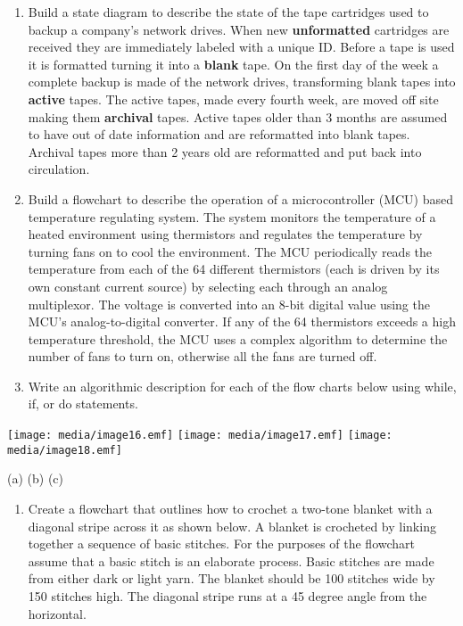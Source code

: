 \begin{itemize}
  \begin{enumerate}
  \def\labelenumi{\arabic{enumi}.}
  \item
    Build a state diagram to describe the state of the tape cartridges
    used to backup a company's network drives. When new
    \textbf{unformatted} cartridges are received they are immediately
    labeled with a unique ID. Before a tape is used it is formatted
    turning it into a \textbf{blank} tape. On the first day of the week
    a complete backup is made of the network drives, transforming blank
    tapes into \textbf{active} tapes. The active tapes, made every
    fourth week, are moved off site making them \textbf{archival} tapes.
    Active tapes older than 3 months are assumed to have out of date
    information and are reformatted into blank tapes. Archival tapes
    more than 2 years old are reformatted and put back into circulation.
  \item
    Build a flowchart to describe the operation of a microcontroller
    (MCU) based temperature regulating system. The system monitors the
    temperature of a heated environment using thermistors and regulates
    the temperature by turning fans on to cool the environment. The MCU
    periodically reads the temperature from each of the 64 different
    thermistors (each is driven by its own constant current source) by
    selecting each through an analog multiplexor. The voltage is
    converted into an 8-bit digital value using the MCU's
    analog-to-digital converter. If any of the 64 thermistors exceeds a
    high temperature threshold, the MCU uses a complex algorithm to
    determine the number of fans to turn on, otherwise all the fans are
    turned off.
  \item
    Write an algorithmic description for each of the flow charts below
    using while, if, or do statements.
  \end{enumerate}
\end{itemize}

\texttt{[image: media/image16.emf]}
\texttt{[image: media/image17.emf]}
\texttt{[image: media/image18.emf]}

(a) (b) (c)

\begin{enumerate}
\def\labelenumi{\arabic{enumi}.}
\setcounter{enumi}{3}
\item
  Create a flowchart that outlines how to crochet a two-tone blanket
  with a diagonal stripe across it as shown below. A blanket is
  crocheted by linking together a sequence of basic stitches. For the
  purposes of the flowchart assume that a basic stitch is an elaborate
  process. Basic stitches are made from either dark or light yarn. The
  blanket should be 100 stitches wide by 150 stitches high. The diagonal
  stripe runs at a 45 degree angle from the horizontal.
\end{enumerate}

